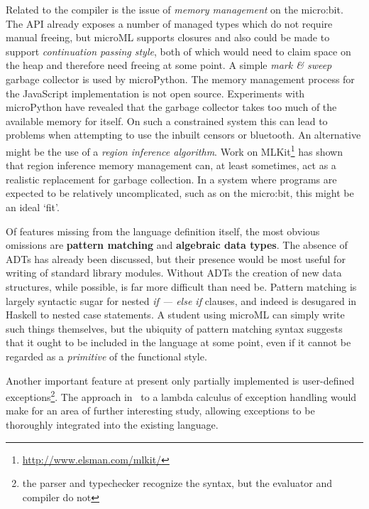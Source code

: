 \documentclass[12pt, a4paper]{report}
\begin{document}
Related to the compiler is the issue of \textit{memory management} on the micro:bit. The API already
exposes a number of managed types which do not require manual freeing, but microML supports closures
and also could be made to support \textit{continuation passing style}, both of which would need to
claim space on the heap and therefore need freeing at some point. A simple \textit{mark \& sweep}
garbage collector is used by microPython. The memory management process for the JavaScript
implementation is not open source. Experiments with microPython have revealed that the garbage
collector takes too much of the available memory for itself. On such a constrained system this can
lead to problems when attempting to use the inbuilt censors or bluetooth. An alternative might be
the use of a \textit{region inference algorithm}\cite{Tofte:1998:RIA:291891.291894}. Work on
MLKit\footnote{\url{http://www.elsman.com/mlkit/}} has shown that region inference memory management
can, at least sometimes, act as a realistic replacement for garbage collection. In a system where
programs are expected to be relatively uncomplicated, such as on the micro:bit, this might be an
ideal `fit'.

Of features missing from the language definition itself, the most obvious omissions are
\textbf{pattern matching} and \textbf{algebraic data types}. The absence of ADTs has already been
discussed, but their presence would be most useful for writing of standard library modules. Without
ADTs the creation of new data structures, while possible, is far more difficult than need be.
Pattern matching is largely syntactic sugar for nested \textit{if --- else if} clauses, and indeed
is desugared in Haskell to nested case statements. A student using microML can simply write such
things themselves, but the ubiquity of pattern matching syntax suggests that it ought to be included
in the language at some point, even if it cannot be regarded as a \textit{primitive} of the
functional style. 

Another important feature at present only partially implemented is user-defined
exceptions\footnote{the parser and typechecker recognize the syntax, but the evaluator and compiler
do not}. The approach in~\cite{deGroote1995} to a lambda calculus of exception handling would make
for an area of further interesting study, allowing exceptions to be thoroughly integrated into the
existing language.
\end{document}
